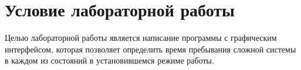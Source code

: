 \section*{Условие лабораторной работы}

Целью лабораторной работы является написание программы с графическим интерфейсом, которая позволяет определить время пребывания сложной системы в каждом из состояний в установившемся режиме работы.
	